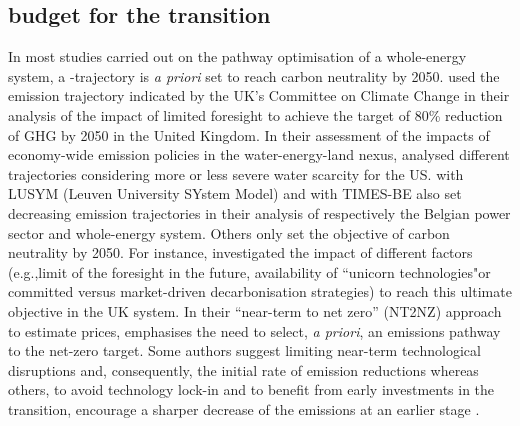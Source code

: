\documentclass[11pt,twoside,a4paper,english]{article}
\def\eg{e.g.,}
\def\og{``}
\def\fg{"}
\begin{document}
\begin{appendices}
\subsection{ budget for the transition}
\label{subsec:cs:CO2-budget}
In most studies carried out on the pathway optimisation of a whole-energy system, a -trajectory is \textit{a priori} set to reach carbon neutrality by 2050. \citet{nerini2017myopic} used the emission trajectory indicated by the UK's Committee on Climate Change in their analysis of the impact of limited foresight to achieve the target of 80\% reduction of \gls{GHG} by 2050 in the United Kingdom. In their assessment of the impacts of economy-wide emission policies in the water-energy-land nexus, \citet{licandeo2023assessing} analysed different  trajectories considering more or less severe water scarcity for the US. \citet{poncelet2016myopic} with LUSYM (Leuven University SYstem Model) and \citet{PATHS2050} with TIMES-BE also set decreasing emission trajectories in their analysis of respectively the Belgian power sector and whole-energy system.  Others only set the objective of carbon neutrality by 2050. For instance, \citet{heuberger2018impact} investigated the impact of different factors (\eg limit of the foresight in the future, availability of \og unicorn technologies\fg or committed versus market-driven decarbonisation strategies) to reach this ultimate objective in the UK system. In their ``near-term to net zero'' (NT2NZ) approach to estimate  prices, \citet{kaufman2020near} emphasises the need to select, \textit{a priori}, an emissions pathway to the net-zero target. Some authors suggest limiting near-term technological disruptions and, consequently, the initial rate of emission reductions \cite{wigley1996economic} whereas others, to avoid technology lock-in and to benefit from early investments in the transition, encourage a sharper decrease of the emissions at an earlier stage \cite{vogt2018starting}.


\end{appendices}
\end{document}
